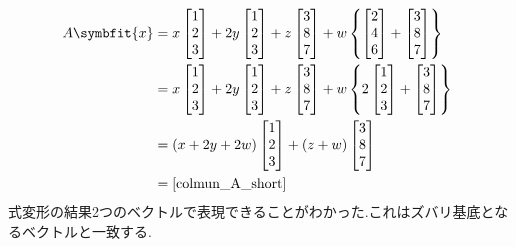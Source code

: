 \begin{align*}
    A\symbfit{x}&=x
    \begin{bmatrix}
        1 \\ 2 \\ 3
    \end{bmatrix}+2y
    \begin{bmatrix}
        1 \\ 2 \\ 3
    \end{bmatrix}+z
    \begin{bmatrix}
        3 \\ 8 \\ 7
    \end{bmatrix}+w
    \left\{
    \begin{bmatrix}
        2 \\ 4 \\ 6
    \end{bmatrix}+
    \begin{bmatrix}
        3 \\ 8 \\ 7
    \end{bmatrix}
    \right\}\ \\
    &=x
    \begin{bmatrix}
        1 \\ 2 \\ 3
    \end{bmatrix}+2y
    \begin{bmatrix}
        1 \\ 2 \\ 3
    \end{bmatrix}+z
    \begin{bmatrix}
        3 \\ 8 \\ 7
    \end{bmatrix}+w
    \left\{2
    \begin{bmatrix}
        1 \\ 2 \\ 3
    \end{bmatrix}+
    \begin{bmatrix}
        3 \\ 8 \\ 7
    \end{bmatrix}
    \right\}\ \\
    &=
    (x+2y+2w)
    \begin{bmatrix}
        1 \\ 2 \\ 3
    \end{bmatrix}+
    (z+w)
    \begin{bmatrix}
        3 \\ 8 \\ 7
    \end{bmatrix}\\
    &=
    \eqref{colmun_A_short}
\end{align*}
式変形の結果2つのベクトルで表現できることがわかった.これはズバリ基底となるベクトルと一致する.

